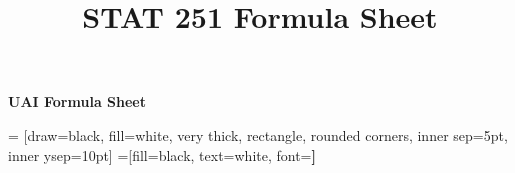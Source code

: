 \documentclass{article}
\title{STAT 251 Formula Sheet}
\begin{document}
\begin{center}{\huge{\textbf{UAI Formula Sheet}}}\\
\end{center}
\begin{multicols*}{2}

 = [draw=black, fill=white, very thick,
    rectangle, rounded corners, inner sep=5pt, inner ysep=10pt]
 =[fill=black, text=white, font=\bfseries]







\end{multicols*}
\end{document}
